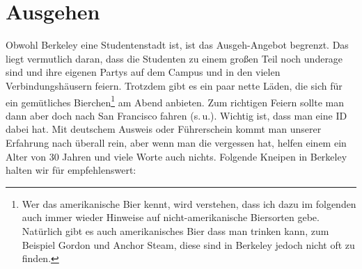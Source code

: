 \documentclass[a4paper]{scrreprt}
\begin{document}
\section{Ausgehen}

Obwohl Berkeley eine Studentenstadt ist, ist das Ausgeh-Angebot begrenzt. Das liegt vermutlich daran, dass die Studenten zu einem großen Teil noch underage sind und ihre eigenen Partys auf dem Campus und in den vielen Verbindungshäusern feiern. Trotzdem gibt es ein paar nette Läden, die sich für ein gemütliches Bierchen\footnote{Wer das amerikanische Bier kennt, wird verstehen, dass ich dazu im folgenden auch immer wieder Hinweise auf nicht-amerikanische Biersorten gebe. Natürlich gibt es auch amerikanisches Bier dass man trinken kann, zum Beispiel Gordon und Anchor Steam, diese sind in Berkeley jedoch nicht oft zu finden.} am Abend anbieten.  Zum richtigen Feiern sollte man dann aber doch nach San Francisco fahren (s.\,u.). Wichtig ist, dass man eine ID dabei hat. Mit deutschem Ausweis oder Führerschein kommt man unserer Erfahrung nach überall rein, aber wenn man die vergessen hat, helfen einem ein Alter von 30 Jahren und viele Worte auch nichts. Folgende Kneipen in Berkeley halten wir für empfehlenswert:
\end{document}
